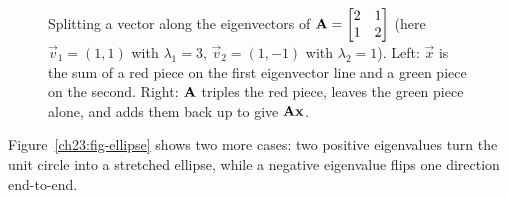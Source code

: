 \begin{figure}[htbp]
\caption{Splitting a vector along the eigenvectors of
$\mathbf{A}=\protect\begin{bmatrix}2&1\\1&2\protect\end{bmatrix}$ (here $\vec{v}_1=(1,1)$
with $\lambda_1=3$, $\vec{v}_2=(1,-1)$ with $\lambda_2=1$). Left: $\vec{x}$ is the sum
of a red piece on the first eigenvector line and a green piece on the second.
Right: $\mathbf{A}$ triples the red piece, leaves the green piece alone, and adds them
back up to give $\mathbf{A}\mathbf{x}$.}
\label{ch23:fig-decompose}
\end{figure}

Figure~\ref{ch23:fig-ellipse} shows two more cases: two positive eigenvalues turn
the unit circle into a stretched ellipse, while a negative eigenvalue flips one
direction end-to-end.

